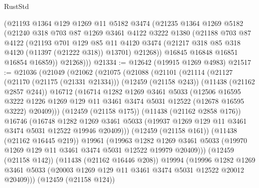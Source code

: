 \begin{lexlean}{RustStd}
\begin{coremodule}
        (@21193
          @1364
          @129
          @1269
          @11
          @5182
          @3474
          (@21235
            @1364
            @1269
            @5182
            (@21240
              @318
              @703
              @87
              @1269
              @3461
              @4122
              @3222
              @1380
              (@21188
                @703
                @87
                @4122
                (@21193
                  @701
                  @129
                  @85
                  @11
                  @4120
                  @3474
                  (@21217 @318 @85 @318 @4120 (@11397 (@21222 @318)) @13701)
                  @21268))
              @16845
              @16848
              @16851
              @16854
              @16859))
          @21268)))
@21334 := @12642 (@19915 @1269 @4983)
@21517 := @21036
    (@21049
      (@21062
        (@21075
          (@21088
            (@21101
              (@21114
                (@21127
                  (@21170 (@21175 (@21331 @21334)))
                  (@12459 (@21158 @243))
                  (@11438 (@21162 @2857 @244))
                  @16712
                  (@16714
                    @1282
                    @1269
                    @3461
                    @5033
                    (@12506
                      @16595
                      @3222
                      @1226
                      @1269
                      @129
                      @11
                      @3461
                      @3474
                      @5031
                      @12522
                      (@12678 @16595 @3222)
                      @20409)))
                (@12459 (@21158 @175))
                (@11438 (@21162 @2858 @176))
                @16746
                (@16748
                  @1282
                  @1269
                  @3461
                  @5033
                  (@19937 @1269 @129 @11 @3461 @3474 @5031 @12522 @19946 @20409)))
              (@12459 (@21158 @161))
              (@11438 (@21162 @16445 @219))
              @19961
              (@19963
                @1282
                @1269
                @3461
                @5033
                (@19970 @1269 @129 @11 @3461 @3474 @5031 @12522 @19979 @20409)))
            (@12459 (@21158 @142))
            (@11438 (@21162 @16446 @208))
            @19994
            (@19996
              @1282
              @1269
              @3461
              @5033
              (@20003 @1269 @129 @11 @3461 @3474 @5031 @12522 @20012 @20409)))
          (@12459 (@21158 @124))

\end{coremodule}
\end{lexlean}
